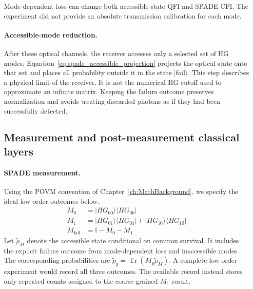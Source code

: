 Mode-dependent loss can change both accessible-state QFI and SPADE CFI.  The experiment did not provide an absolute transmission calibration for each mode.

\paragraph{Accessible-mode reduction.}
After these optical channels, the receiver accesses only a selected set of HG modes.  Equation~\eqref{eq:spade_accessible_projection} projects the optical state onto that set and places all probability outside it in the state $|\mathrm{fail}\rangle$.  This step describes a physical limit of the receiver.  It is not the numerical HG cutoff used to approximate an infinite matrix.  Keeping the failure outcome preserves normalization and avoids treating discarded photons as if they had been successfully detected.

\subsection{Measurement and post-measurement classical layers}

\paragraph{SPADE measurement.}
Using the POVM convention of Chapter~\ref{ch:MathBackground}, we specify the ideal low-order outcomes below.
\begin{align}
    M_0               & =|HG_{00}\rangle\langle HG_{00}|\nonumber \\
    M_1               & =|HG_{01}\rangle\langle HG_{01}|
    +|HG_{10}\rangle\langle HG_{10}|\nonumber                     \\
    M_{\mathrm{fail}} & =\mathbb{I}-M_0-M_1
    \label{eq:spade_imperfect_povm}
\end{align}
Let $\widetilde{\rho}_M$ denote the accessible state conditional on common survival. It includes the explicit failure outcome from mode-dependent loss and inaccessible modes. The corresponding probabilities are $\widetilde{p}_y=\operatorname{Tr}(M_y\widetilde{\rho}_M)$. A complete low-order experiment would record all three outcomes. The available record instead stores only repeated counts assigned to the coarse-grained $M_1$ result.

